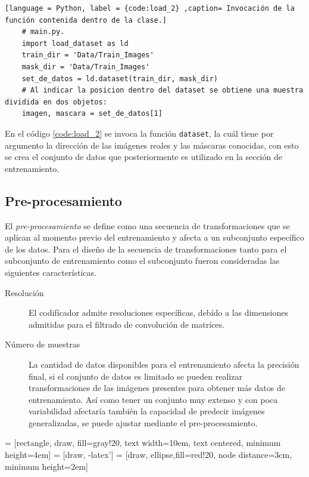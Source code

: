 \begin{lstlisting}[language = Python, label = {code:load_2} ,caption= Invocación de la función contenida dentro de la clase.]
    # main.py.
    import load_dataset as ld 
    train_dir = 'Data/Train_Images'
    mask_dir = 'Data/Train_Images'
    set_de_datos = ld.dataset(train_dir, mask_dir)
    # Al indicar la posicion dentro del dataset se obtiene una muestra dividida en dos objetos:
    imagen, mascara = set_de_datos[1]

\end{lstlisting}

En el código \ref{code:load_2} se invoca la función \texttt{dataset}, la cuál tiene por argumento la dirección de las imágenes reales y las máscaras conocidas, con esto se crea el conjunto de datos que posteriormente es utilizado en la sección de entrenamiento.


\subsection{Pre-procesamiento}
El \emph{pre-procesamiento} se define como una secuencia de transformaciones que se aplican al momento previo del entrenamiento y afecta a un subconjunto específico de los datos. Para el diseño de la secuencia de transformaciones tanto para el subconjunto de entrenamiento como el subconjunto fueron consideradas las siguientes características.

\begin{description}
    \item[Resolución]{ El codifícador admite resoluciones específicas, debído a las dimensiones admitidas para el filtrado de convolución de matríces.}
    \item[Número de muestras]{La cantidad de datos disponibles para el entrenamiento afecta la precisión final, si el conjunto de datos es limitado se pueden realizar transformaciones de las imágenes presentes para obtener más datos de entrenamiento. Así como tener un conjunto muy extenso y con poca variabilidad afectaría también la capacidad de predecir imágenes generalizadas, se puede ajustar mediante el pre-procesamiento.}
    \item[] 
\end{description}


 = [rectangle, draw, fill=gray!20, 
    text width=10em, text centered, minimum height=4em]
 = [draw, -latex']
 = [draw, ellipse,fill=red!20, node distance=3cm,
    minimum height=2em]

